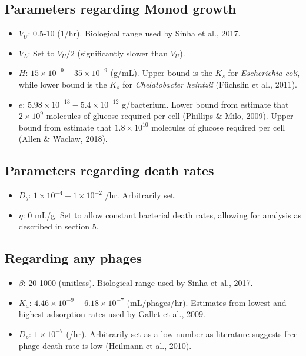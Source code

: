 \documentclass{article}
\begin{document}
\subsection{Parameters regarding Monod growth}

\begin{itemize}
\item $V_U$: 0.5-10 (1/hr). Biological range used by Sinha et al., 2017. 

\item $V_L$: Set to $V_U/2$ (significantly slower than $V_U$).

\item $H$: $15 \times 10^{-9} - 35 \times 10^{-9}$ (g/mL). Upper bound is the $K_s$ for \textit{Escherichia coli}, while lower bound is the $K_s$ for \textit{Chelatobacter heintzii} (Füchslin et al., 2011). 

\item $e$: $5.98\times 10^{-13} - 5.4 \times 10^{-12}$ g/bacterium. Lower bound from estimate that $2 \times 10^9$ molecules of glucose required per cell (Phillips $\&$ Milo, 2009).  Upper bound from estimate that $1.8 \times 10^{10}$ molecules of glucose required per cell (Allen $\&$ Waclaw, 2018). 
\end{itemize}

\subsection{Parameters regarding death rates}
\begin{itemize}
\item $D_b$: $1 \times 10^{-4} - 1 \times 10^{-2}$ /hr. Arbitrarily set.

\item $\eta$: 0 mL/g. Set to allow constant bacterial death rates, allowing for analysis as described in section 5.
\end{itemize}

\subsection{Regarding any phages}
\begin{itemize}
\item $\beta$: 20-1000 (unitless). Biological range used by Sinha et al., 2017. 
\item $K_a$: $4.46 \times 10^{-9} - 6.18 \times 10^{-7}$ (mL/phages/hr). Estimates from lowest and highest adsorption rates used by Gallet et al., 2009.
\item $D_p$: $1 \times 10^{-7}$ (/hr). Arbitrarily set as a low number as literature suggests free phage death rate is low (Heilmann et al., 2010).
\end{itemize}
\end{document}
